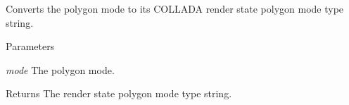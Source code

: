 \label{namespaceFUDaePassStatePolygonMode_a0c453206db713d870cbadd76c7412a50}
Converts the polygon mode to its COLLADA render state polygon mode type string. 
\begin{DoxyParams}{Parameters}
\item[{\em mode}]The polygon mode. \end{DoxyParams}
\begin{DoxyReturn}{Returns}
The render state polygon mode type string. 
\end{DoxyReturn}
